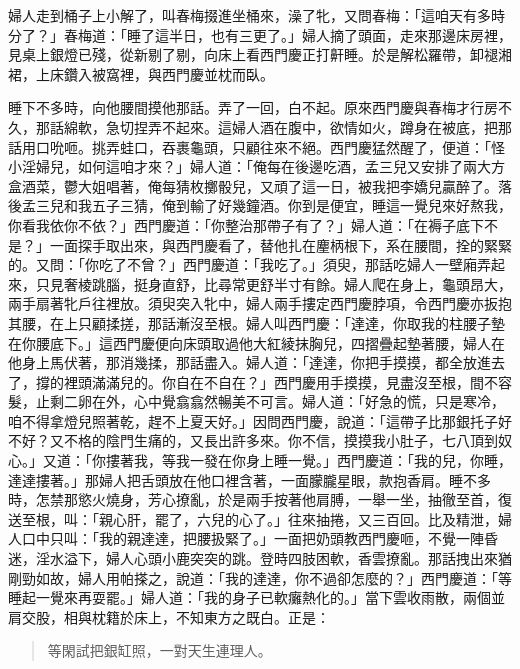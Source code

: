 婦人走到桶子上小解了，叫春梅掇進坐桶來，澡了牝，又問春梅：「這咱天有多時分了？」春梅道：「睡了這半日，也有三更了。」婦人摘了頭面，走來那邊床房裡，見桌上銀燈已殘，從新剔了剔，向床上看西門慶正打鼾睡。於是解松羅帶，卸褪湘裙，上床鑽入被窩裡，與西門慶並枕而臥。

睡下不多時，向他腰間摸他那話。弄了一回，白不起。原來西門慶與春梅才行房不久，那話綿軟，急切捏弄不起來。這婦人酒在腹中，欲情如火，蹲身在被底，把那話用口吮咂。挑弄蛙口，吞裹龜頭，只顧往來不絕。西門慶猛然醒了，便道：「怪小淫婦兒，如何這咱才來？」婦人道：「俺每在後邊吃酒，孟三兒又安排了兩大方盒酒菜，鬱大姐唱著，俺每猜枚擲骰兒，又頑了這一日，被我把李嬌兒贏醉了。落後孟三兒和我五子三猜，俺到輸了好幾鐘酒。你到是便宜，睡這一覺兒來好熬我，你看我依你不依？」西門慶道：「你整治那帶子有了？」婦人道：「在褥子底下不是？」一面探手取出來，與西門慶看了，替他扎在麈柄根下，系在腰間，拴的緊緊的。又問：「你吃了不曾？」西門慶道：「我吃了。」須臾，那話吃婦人一壁廂弄起來，只見奢棱跳腦，挺身直舒，比尋常更舒半寸有餘。婦人爬在身上，龜頭昂大，兩手扇著牝戶往裡放。須臾突入牝中，婦人兩手摟定西門慶脖項，令西門慶亦扳抱其腰，在上只顧揉搓，那話漸沒至根。婦人叫西門慶：「達達，你取我的柱腰子墊在你腰底下。」這西門慶便向床頭取過他大紅綾抹胸兒，四摺疊起墊著腰，婦人在他身上馬伏著，那消幾揉，那話盡入。婦人道：「達達，你把手摸摸，都全放進去了，撐的裡頭滿滿兒的。你自在不自在？」西門慶用手摸摸，見盡沒至根，間不容髮，止剩二卵在外，心中覺翕翕然暢美不可言。婦人道：「好急的慌，只是寒冷，咱不得拿燈兒照著乾，趕不上夏天好。」因問西門慶，說道：「這帶子比那銀托子好不好？又不格的陰門生痛的，又長出許多來。你不信，摸摸我小肚子，七八頂到奴心。」又道：「你摟著我，等我一發在你身上睡一覺。」西門慶道：「我的兒，你睡，達達摟著。」那婦人把舌頭放在他口裡含著，一面朦朧星眼，款抱香肩。睡不多時，怎禁那慾火燒身，芳心撩亂，於是兩手按著他肩膊，一舉一坐，抽徹至首，復送至根，叫：「親心肝，罷了，六兒的心了。」往來抽捲，又三百回。比及精泄，婦人口中只叫：「我的親達達，把腰扱緊了。」一面把奶頭教西門慶咂，不覺一陣昏迷，淫水溢下，婦人心頭小鹿突突的跳。登時四肢困軟，香雲撩亂。那話拽出來猶剛勁如故，婦人用帕搽之，說道：「我的達達，你不過卻怎麼的？」西門慶道：「等睡起一覺來再耍罷。」婦人道：「我的身子已軟癱熱化的。」當下雲收雨散，兩個並肩交股，相與枕籍於床上，不知東方之既白。正是：
\begin{quote}
等閑試把銀缸照，一對天生連理人。
\end{quote}
